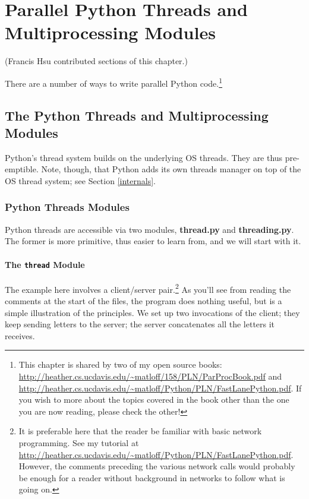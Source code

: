 \chapter{Parallel Python Threads and Multiprocessing Modules} 
\label{chap:pythr}

(Francis Hsu contributed sections of this chapter.)

There are a number of ways to write parallel Python code.\footnote{This 
chapter is shared by two of my open source books:
\url{http://heather.cs.ucdavis.edu/~matloff/158/PLN/ParProcBook.pdf} and
\url{http://heather.cs.ucdavis.edu/~matloff/Python/PLN/FastLanePython.pdf}.
If you wish to more about the topics covered in the book other than the
one you are now reading, please check the other!}

\section{The Python Threads and Multiprocessing Modules}

Python's thread system builds on the underlying OS threads.  They are
thus pre-emptible.  Note, though, that Python adds its own threads
manager on top of the OS thread system; see Section \ref{internals}.

\subsection{Python Threads Modules}

Python threads are accessible via two modules, {\bf thread.py} and {\bf
threading.py}.  The former is more primitive, thus easier to learn from,
and we will start with it.

\subsubsection{The {\tt thread} Module}
\label{threadmodex}

The example here involves a client/server pair.\footnote{It is
preferable here that the reader be familiar with basic network
programming.  See my tutorial at
\url{http://heather.cs.ucdavis.edu/~matloff/Python/PLN/FastLanePython.pdf}.  However,
the comments preceding the various network calls would probably be
enough for a reader without background in networks to follow what is
going on.} As you'll see from reading the comments at the start of the
files, the program does nothing useful, but is a simple illustration of
the principles.  We set up two invocations of the client; they keep
sending letters to the server; the server concatenates all the letters
it receives.


